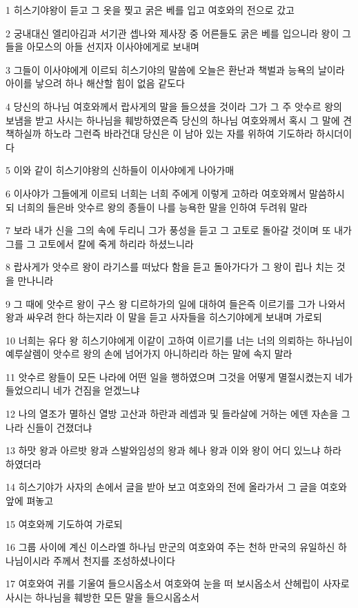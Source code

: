 \par 1 히스기야왕이 듣고 그 옷을 찢고 굵은 베를 입고 여호와의 전으로 갔고
\par 2 궁내대신 엘리아김과 서기관 셉나와 제사장 중 어른들도 굵은 베를 입으니라 왕이 그들을 아모스의 아들 선지자 이사야에게로 보내며
\par 3 그들이 이사야에게 이르되 히스기야의 말씀에 오늘은 환난과 책벌과 능욕의 날이라 아이를 낳으려 하나 해산할 힘이 없음 같도다
\par 4 당신의 하나님 여호와께서 랍사게의 말을 들으셨을 것이라 그가 그 주 앗수르 왕의 보냄을 받고 사시는 하나님을 훼방하였은즉 당신의 하나님 여호와께서 혹시 그 말에 견책하실까 하노라 그런즉 바라건대 당신은 이 남아 있는 자를 위하여 기도하라 하시더이다
\par 5 이와 같이 히스기야왕의 신하들이 이사야에게 나아가매
\par 6 이사야가 그들에게 이르되 너희는 너희 주에게 이렇게 고하라 여호와께서 말씀하시되 너희의 들은바 앗수르 왕의 종들이 나를 능욕한 말을 인하여 두려워 말라
\par 7 보라 내가 신을 그의 속에 두리니 그가 풍성을 듣고 그 고토로 돌아갈 것이며 또 내가 그를 그 고토에서 칼에 죽게 하리라 하셨느니라
\par 8 랍사게가 앗수르 왕이 라기스를 떠났다 함을 듣고 돌아가다가 그 왕이 립나 치는 것을 만나니라
\par 9 그 때에 앗수르 왕이 구스 왕 디르하가의 일에 대하여 들은즉 이르기를 그가 나와서 왕과 싸우려 한다 하는지라 이 말을 듣고 사자들을 히스기야에게 보내며 가로되
\par 10 너희는 유다 왕 히스기야에게 이같이 고하여 이르기를 너는 너의 의뢰하는 하나님이 예루살렘이 앗수르 왕의 손에 넘어가지 아니하리라 하는 말에 속지 말라
\par 11 앗수르 왕들이 모든 나라에 어떤 일을 행하였으며 그것을 어떻게 멸절시켰는지 네가 들었으리니 네가 건짐을 얻겠느냐
\par 12 나의 열조가 멸하신 열방 고산과 하란과 레셉과 및 들라살에 거하는 에덴 자손을 그 나라 신들이 건졌더냐
\par 13 하맛 왕과 아르밧 왕과 스발와임성의 왕과 헤나 왕과 이와 왕이 어디 있느냐 하라 하였더라
\par 14 히스기야가 사자의 손에서 글을 받아 보고 여호와의 전에 올라가서 그 글을 여호와 앞에 펴놓고
\par 15 여호와께 기도하여 가로되
\par 16 그룹 사이에 계신 이스라엘 하나님 만군의 여호와여 주는 천하 만국의 유일하신 하나님이시라 주께서 천지를 조성하셨나이다
\par 17 여호와여 귀를 기울여 들으시옵소서 여호와여 눈을 떠 보시옵소서 산헤립이 사자로 사시는 하나님을 훼방한 모든 말을 들으시옵소서
